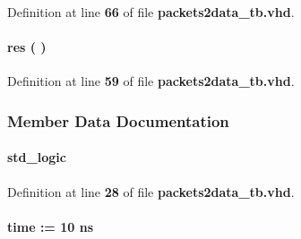 Definition at line {\bf 66} of file {\bf packets2data\+\_\+tb.\+vhd}.

\paragraph[{res}]{\setlength{\rightskip}{0pt plus 5cm} {\bfseries \textcolor{vhdlchar}{ }} res ( ) \hspace{0.3cm}{\ttfamily [Process]}}\label{classpackets2data__tb_1_1tb__behave_ab0bd7560790c13b656fd58e17e35143e}


Definition at line {\bf 59} of file {\bf packets2data\+\_\+tb.\+vhd}.



\subsubsection{Member Data Documentation}
\paragraph[{clk0}]{ {\bfseries \textcolor{comment}{std\+\_\+logic}\textcolor{vhdlchar}{ }} \hspace{0.3cm}{\ttfamily [Signal]}}\label{classpackets2data__tb_1_1tb__behave_a693d72741b9413130fe2d67511b642be}


Definition at line {\bf 28} of file {\bf packets2data\+\_\+tb.\+vhd}.

\paragraph[{clk0\+\_\+period}]{ {\bfseries \textcolor{comment}{time}\textcolor{vhdlchar}{ }\textcolor{vhdlchar}{ }\textcolor{vhdlchar}{\+:}\textcolor{vhdlchar}{=}\textcolor{vhdlchar}{ }\textcolor{vhdlchar}{ }\textcolor{vhdlchar}{ } \textcolor{vhdldigit}{10} \textcolor{vhdlchar}{ }\textcolor{vhdlchar}{ns}\textcolor{vhdlchar}{ }} \hspace{0.3cm}{\ttfamily [Constant]}}\label{classpackets2data__tb_1_1tb__behave_ad03d90619a1930e0f5daa16a616edd90}


